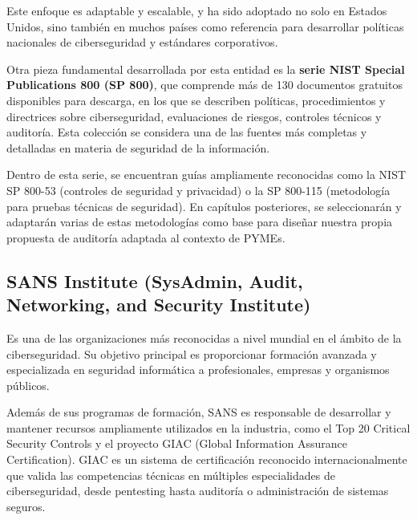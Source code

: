 \documentclass[a4paper, 11pt]{article}
\begin{document}
Este enfoque es adaptable y escalable, y ha sido adoptado no solo en Estados Unidos, sino también en muchos países como referencia para desarrollar políticas nacionales de ciberseguridad y estándares corporativos.

\par\vspace{0.5cm}

Otra pieza fundamental desarrollada por esta entidad es la \textbf{serie NIST Special Publications 800 (SP 800)}, que comprende más de 130 documentos gratuitos disponibles para descarga, en los que se describen políticas, procedimientos y directrices sobre ciberseguridad, evaluaciones de riesgos, controles técnicos y auditoría. Esta colección se considera una de las fuentes más completas y detalladas en materia de seguridad de la información. \cite{nistsp}
\par\vspace{0.5cm}

Dentro de esta serie, se encuentran guías ampliamente reconocidas como la NIST SP 800-53 (controles de seguridad y privacidad) o la SP 800-115 (metodología para pruebas técnicas de seguridad). En capítulos posteriores, se seleccionarán y adaptarán varias de estas metodologías como base para diseñar nuestra propia propuesta de auditoría adaptada al contexto de PYMEs.


\par\vspace{0.5cm}



\subsection*{SANS Institute (SysAdmin, Audit, Networking, and Security Institute)}
Es una de las organizaciones más reconocidas a nivel mundial en el ámbito de la ciberseguridad. 
Su objetivo principal es proporcionar formación avanzada y especializada en seguridad informática a profesionales, empresas y organismos públicos. \cite{sans}
\par\vspace{0.5cm}

Además de sus programas de formación, SANS es responsable de desarrollar y mantener recursos ampliamente utilizados en la industria, como el Top 20 Critical Security Controls y el proyecto GIAC (Global Information Assurance Certification). GIAC es un sistema de certificación reconocido internacionalmente que valida las competencias técnicas en múltiples especialidades de ciberseguridad, desde pentesting hasta auditoría o administración de sistemas seguros. \cite{sanscert}
\par\vspace{0.5cm}
\end{document}
